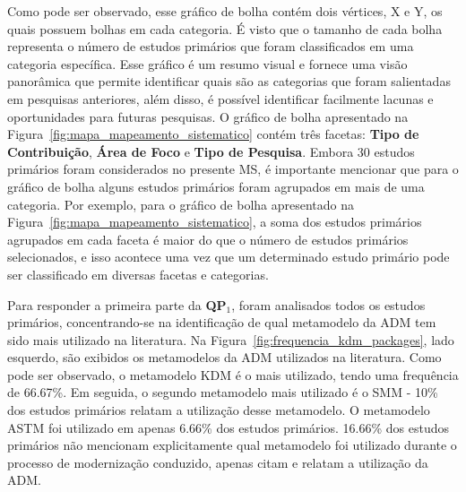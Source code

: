 Como pode ser observado, esse gráfico de bolha contém dois vértices, X e Y, os quais possuem bolhas em cada categoria. É visto que o tamanho de cada bolha representa o número de estudos primários que foram classificados em uma categoria específica. Esse gráfico é um resumo visual e fornece uma visão panorâmica que permite identificar quais são as categorias que foram salientadas em pesquisas anteriores, além disso, é possível identificar facilmente lacunas e oportunidades para futuras pesquisas. O gráfico de bolha apresentado na Figura~\ref{fig:mapa_mapeamento_sistematico} contém três facetas: \textbf{Tipo de Contribuição}, \textbf{Área de Foco} e \textbf{Tipo de Pesquisa}. Embora 30 estudos primários foram considerados no presente MS, é importante mencionar que para o gráfico de bolha alguns estudos primários foram agrupados em mais de uma categoria. Por exemplo, para o gráfico de bolha apresentado na Figura~\ref{fig:mapa_mapeamento_sistematico}, a soma dos estudos primários agrupados em cada faceta é maior do que o número de estudos primários selecionados, e isso acontece uma vez que um determinado estudo primário pode ser classificado em diversas facetas e categorias.

Para responder a primeira parte da \textbf{QP$_1$}, foram analisados todos os estudos primários, concentrando-se na identificação de qual metamodelo da ADM tem sido mais utilizado na literatura. Na Figura~\ref{fig:frequencia_kdm_packages}, lado esquerdo, são exibidos os metamodelos da ADM utilizados na literatura. Como pode ser observado, o metamodelo KDM é o mais utilizado, tendo uma frequência de 66.67\%. Em seguida, o segundo metamodelo mais utilizado é o SMM - 10\% dos estudos primários relatam a utilização desse metamodelo. O metamodelo ASTM foi utilizado em apenas 6.66\% dos estudos primários. 16.66\% dos estudos primários não mencionam explicitamente qual metamodelo foi utilizado durante o processo de modernização conduzido, apenas citam e relatam a utilização da ADM.

